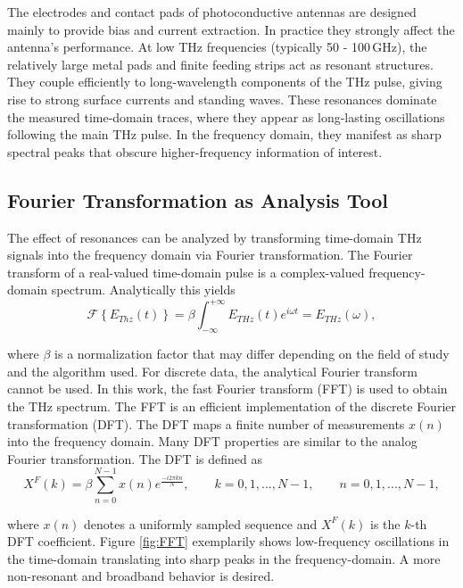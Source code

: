 The electrodes and contact pads of photoconductive antennas are designed mainly to provide bias and current extraction. In practice they strongly affect the antenna’s performance. At low THz frequencies (typically \num{50} - \num{100}\,\si{\giga \hertz}), the relatively large metal pads and finite feeding strips act as resonant
structures. They couple efficiently to long-wavelength components of the THz pulse, giving rise to strong
surface currents and standing waves. These resonances dominate the measured time-domain traces, where they appear as long-lasting oscillations following the main THz pulse. In the frequency domain, they manifest as sharp spectral peaks that obscure higher-frequency information of interest.

\subsection{Fourier Transformation as Analysis Tool}

The effect of resonances can be analyzed by transforming time-domain THz signals into the frequency domain
via Fourier transformation. The Fourier transform of a real-valued time-domain pulse is a complex-valued frequency-domain spectrum. Analytically this yields \cite{MathematicalMethodsPhysics} 
\begin{equation}
    \mathcal{F}\left\{
        E_{Thz}(t) 
    \right\} = \beta \int_{-\infty}^{+\infty} E_{THz}(t)e^{i\omega t} = E_{THz}(\omega),
\end{equation}

where $\beta$ is a normalization factor that may differ depending on the field of study and the algorithm used. For discrete data, the analytical Fourier transform cannot be used. In this work, the fast Fourier transform (FFT) is used to obtain the THz spectrum. The FFT is an efficient implementation of the discrete Fourier transformation (DFT). The DFT maps a finite number of measurements $x(n)$ into the frequency domain. Many DFT properties are similar to the analog Fourier transformation. The DFT is defined as \cite{raoFastFourierTransform2010}
\begin{equation}
    X^F(k) = \beta \sum_{n = 0}^{N - 1}x(n)e^{\frac{-i2\pi k n}{N}}, \qquad k = 0, 1, ..., N-1, \qquad n = 0, 1, ..., N-1,
\end{equation}

where $x(n)$ denotes a uniformly sampled sequence and $X^F(k)$ is the $k$-th DFT coefficient. Figure \ref{fig:FFT} exemplarily  shows 
low-frequency oscillations in the time-domain translating into sharp peaks in the frequency-domain. A more non-resonant and broadband behavior is desired. 


